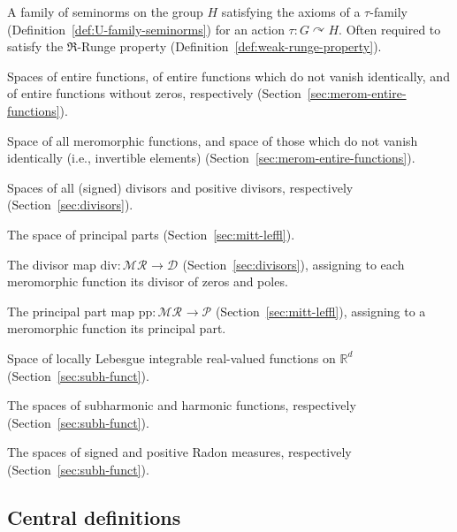 \documentclass[12pt]{paper}
\numberwithin{equation}{section}
\theoremstyle{plain}
\theoremstyle{definition}
\newcommand{\Rd}{\mathbb{R}^{d}}
\newcommand{\mfR}{\mathfrak{R}}
\newcommand{\merom}[1][]{\mathcal{MR}_{#1}}
\newcommand{\meromnz}{\merom^{\times}}
\newcommand{\holomnz}[1][]{\mathcal{E}^{\times}_{#1}}
\newcommand{\holom}[1][]{\mathcal{E}_{#1}}
\newcommand{\divis}[1][]{\mathcal{D}_{#1}}
\newcommand{\divisp}[1][]{\divis[#1]^{+}}
\newcommand{\ppart}{\mathcal{P}}
\newcommand{\dm}{\mathrm{div}}      %
\newcommand{\ppm}{\mathrm{pp}}      %
\newcommand{\unifn}{\mathsf{N}}
\newcommand{\acts}{\curvearrowright}
\begin{document}
\begin{notation-list}
\item[\(\unifn\)] A family of seminorms on the group \(H\) satisfying the axioms of a
  \(\tau\)-family (Definition~\ref{def:U-family-seminorms}) for an action \(\tau:G\acts H\). Often
  required to satisfy the \(\mfR\)-Runge property (Definition~\ref{def:weak-runge-property}).

\item[\(\holom\), {\(\holom[\ne 0]\)}, \(\holomnz\)] Spaces of entire functions, of entire functions
  which do not vanish identically, and of entire functions without zeros, respectively
  (Section~\ref{sec:merom-entire-functions}).

\item[\(\merom, \meromnz\)] Space of all meromorphic functions, and space of those which do not
  vanish identically (i.e., invertible elements) (Section~\ref{sec:merom-entire-functions}).

\item[\(\divis,\divisp\)] Spaces of all (signed) divisors and positive divisors, respectively
  (Section~\ref{sec:divisors}).

\item[\(\ppart\)] The space of principal parts (Section~\ref{sec:mitt-leffl}).

\item[\(\dm\)] The divisor map \(\dm:\merom\to\divis\) (Section~\ref{sec:divisors}), assigning to
  each meromorphic function its divisor of zeros and poles.

\item[\(\ppm\)] The principal part map \(\ppm:\merom\to\ppart\)
  (Section~\ref{sec:mitt-leffl}), assigning to a meromorphic function its principal part.

\item[\(L^1_{\rm loc}(\Rd)\)] Space of locally Lebesgue integrable real-valued functions on
  \(\Rd\) (Section~\ref{sec:subh-funct}).

\item[\(\mathcal{SH}\), \(\mathcal{H}\)] The spaces of subharmonic and harmonic functions,
  respectively (Section~\ref{sec:subh-funct}).

\item[\(\mathcal{M},\mathcal{M}^+\)] The spaces of signed and positive Radon measures, respectively
  (Section~\ref{sec:subh-funct}).
\end{notation-list}



\subsection*{Central definitions}
\end{document}
